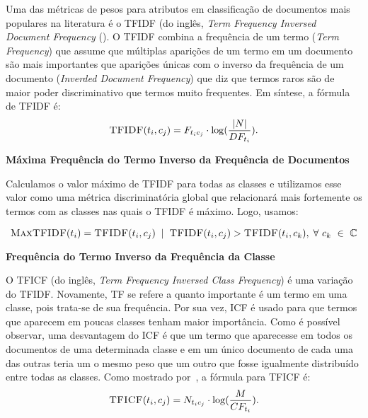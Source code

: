\begin{description}
Uma das métricas de pesos para atributos em classificação de documentos mais populares na literatura é o \textsc{TFIDF} (do inglês, \textit{Term Frequency Inversed Document Frequency} (\cite{Salton88}). O \textsc{TFIDF} combina a frequência de um termo (\textit{Term Frequency}) que assume que múltiplas aparições de um termo em um documento são mais importantes que aparições únicas com o inverso da frequência de um documento (\textit{Inverded Document Frequency}) que diz que termos raros são de maior poder discriminativo que termos muito frequentes. Em síntese, a fórmula de \textsc{TFIDF} é:
\begin{equation}\label{eqn::tficf}
 \textsc{TFIDF}(t_i, c_j) =  F_{t_ic_j} \cdot \log( \frac{|N|} {DF_{t_i}} ).
\end{equation}


\item{\textbf{Máxima Frequência do Termo Inverso da Frequência de Documentos}}%
\label{item::maxtfidf}

Calculamos o valor máximo de \textsc{TFIDF} para todas as classes e utilizamos esse valor como uma métrica discriminatória global que relacionará mais fortemente os termos com as classes nas quais o \textsc{TFIDF} é máximo. Logo, usamos:

\begin{equation}\label{eqn::maxdom}
 \textsc{MaxTFIDF}(t_i) = \textsc{TFIDF}(t_i,c_j) \; \; | \;\; \textsc{TFIDF}(t_i, c_j) > \textsc{TFIDF}(t_i, c_k), \; \forall\ c_k\ \in\ \mathbb{C}
\end{equation}

\item{\textbf{Frequência do Termo Inverso da Frequência da Classe}}%
\label{item::tficf}

O \textsc{TFICF} (do inglês, \textit{Term Frequency Inversed Class Frequency}) é uma variação do \textsc{TFIDF}. Novamente, \textsc{TF} se refere a quanto importante é um termo em uma classe, pois trata-se de sua frequência. Por sua vez, \textsc{ICF} é usado para que termos que aparecem em poucas classes tenham maior importância.
Como é possível observar, uma desvantagem do \textsc{ICF} é que um termo que aparecesse em todos os documentos de uma determinada classe e em um único documento de cada uma das outras teria um o mesmo peso que um outro que fosse igualmente distribuído entre todas as classes. 
Como mostrado por~\cite{ChihHow04}, a fórmula para \textsc{TFICF} é:
\begin{equation}\label{eqn::tficf}
 \textsc{TFICF}(t_i, c_j) = N_{t_ic_j} \cdot \log( \frac{M}{CF_{t_i}} ).
\end{equation}


\end{description}

